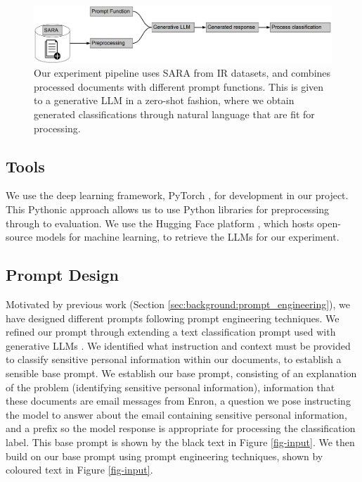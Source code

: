 \begin{figure}[!h]
\begin{center}
\includegraphics[scale=0.3]{figures/pipeline.pdf}
\end{center}
\caption{\label{fig-pipeline}Our experiment pipeline uses SARA from IR datasets, and combines processed documents with different prompt functions. This is given to a generative LLM in a zero-shot fashion, where we obtain generated classifications through natural language that are fit for processing.}
\end{figure}

\subsection{Tools}
We use the deep learning framework, PyTorch \cite{paszke2019pytorch}, for development in our project. This Pythonic approach allows us to use Python libraries for preprocessing through to evaluation. We use the Hugging Face platform \cite{wolf-etal-2020-transformers}, which hosts open-source models for machine learning, to retrieve the LLMs for our experiment.

\subsection{Prompt Design}
Motivated by previous work (Section \ref{sec:background:prompt_engineering}), we have designed different prompts following prompt engineering techniques. We refined our prompt through extending a text classification prompt used with generative LLMs \cite{kocon2023chatgpt, puri2019zero}. We identified what instruction and context must be provided to classify sensitive personal information within our documents, to establish a sensible base prompt. We establish our base prompt, consisting of an explanation of the problem (identifying sensitive personal information), information that these documents are email messages from Enron, a question we pose instructing the model to answer about the email containing sensitive personal information, and a prefix so the model response is appropriate for processing the classification label. This base prompt is shown by the black text in Figure \ref{fig-input}. We then build on our base prompt using prompt engineering techniques, shown by coloured text in Figure \ref{fig-input}.

